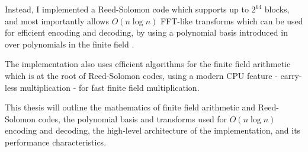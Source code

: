 Instead, I implemented a Reed-Solomon code which supports up to $2^{64}$ blocks, and most importantly allows $O(n \log n)$ FFT-like transforms which can be used for efficient encoding and decoding,
by using a polynomial basis introduced in \cite{novel-poly} over polynomials in the finite field .

The implementation also uses efficient algorithms for the finite field arithmetic which is at the root of Reed-Solomon codes, using a modern CPU feature - carry-less multiplication \cite{intel-clmul} - for fast finite field multiplication.

This thesis will outline the mathematics of finite field arithmetic and Reed-Solomon codes, the polynomial basis and transforms used for $O(n \log n)$ encoding and decoding, the high-level architecture of the implementation, and its performance characteristics.
